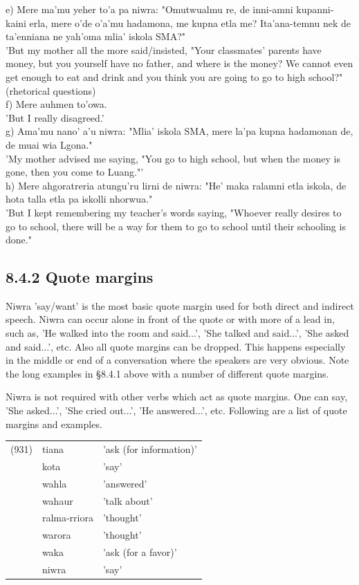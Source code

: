 \documentclass[10pt]{article}
\begin{document}
e) Mere ma'mu yeher to'a pa niwra: "Omutwualmu re, de inni-amni kupanni-kaini erla, mere o'de o'a'mu hadamona, me kupna etla me? Ita'ana-temnu nek de ta'enniana ne yah'oma mlia' iskola SMA?"\\
'But my mother all the more said/insisted, "Your classmates' parents have money, but you yourself have no father, and where is the money? We cannot even get enough to eat and drink and you think you are going to go to high school?" (rhetorical questions)\\
f) Mere auhmen to'owa.\\
'But I really disagreed.'\\
g) Ama'mu nano' a'u niwra: "Mlia' iskola SMA, mere la'pa kupna hadamonan de, de muai wia Lgona."\\
'My mother advised me saying, "You go to high school, but when the money is gone, then you come to Luang."'\\
h) Mere ahgoratreria atungu'ru lirni de niwra: "He' maka ralamni etla iskola, de hota talla etla pa iskolli nhorwua."\\
'But I kept remembering my teacher's words saying, "Whoever really desires to go to school, there will be a way for them to go to school until their schooling is done."

\subsection*{8.4.2 Quote margins}
Niwra 'say/want' is the most basic quote margin used for both direct and indirect speech. Niwra can occur alone in front of the quote or with more of a lead in, such as, 'He walked into the room and said...', 'She talked and said...', 'She asked and said...', etc. Also all quote margins can be dropped. This happens especially in the middle or end of a conversation where the speakers are very obvious. Note the long examples in §8.4.1 above with a number of different quote margins.

Niwra is not required with other verbs which act as quote margins. One can say, 'She asked...', 'She cried out...', 'He answered...', etc. Following are a list of quote margins and examples.

\begin{center}
\begin{tabular}{lll}
(931) & tiana & 'ask (for information)' \\
 & kota & 'say' \\
 & wahla & 'answered' \\
 & wahaur & 'talk about' \\
 & ralma-rriora & 'thought' \\
 & warora & 'thought' \\
 & waka & 'ask (for a favor)' \\
 & niwra & 'say' \\
\end{tabular}
\end{center}
\end{document}
